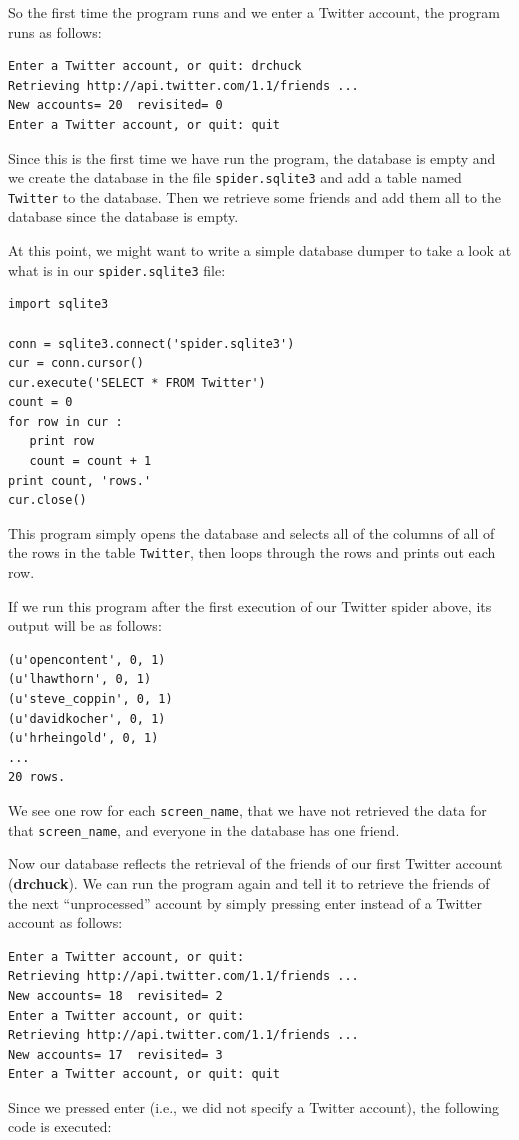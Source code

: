 So the first time the program runs and we enter a Twitter account, the program
runs as follows:

\beforeverb
\begin{verbatim}
Enter a Twitter account, or quit: drchuck
Retrieving http://api.twitter.com/1.1/friends ...
New accounts= 20  revisited= 0
Enter a Twitter account, or quit: quit
\end{verbatim}
\afterverb
%
Since this is the first time we have run the program, the database
is empty and we create the database in the file {\tt spider.sqlite3} and
add a table named {\tt Twitter} to the database.  Then we retrieve
some friends and add them all to the database since the database is
empty.

At this point, we might want to write a simple database dumper
to take a look at what is in our {\tt spider.sqlite3} file:

\beforeverb
\begin{verbatim}
import sqlite3

conn = sqlite3.connect('spider.sqlite3')
cur = conn.cursor()
cur.execute('SELECT * FROM Twitter')
count = 0
for row in cur :
   print row
   count = count + 1
print count, 'rows.'
cur.close()
\end{verbatim}
\afterverb
%
This program simply opens the database and selects all of the 
columns of all of the rows in the table {\tt Twitter}, then 
loops through the rows and prints out each row.

If we run this program after the first execution of our Twitter
spider above, its output will be as follows:

\beforeverb
\begin{verbatim}
(u'opencontent', 0, 1)
(u'lhawthorn', 0, 1)
(u'steve_coppin', 0, 1)
(u'davidkocher', 0, 1)
(u'hrheingold', 0, 1)
...
20 rows.
\end{verbatim}
\afterverb
%
We see one row for each \verb"screen_name", that we 
have not retrieved the data for that \verb"screen_name", and 
everyone in the database has one friend.

Now our database reflects the retrieval of the friends of 
our first Twitter account ({\bf drchuck}).  We can run the program
again and tell it to retrieve the friends of the next 
``unprocessed'' account by simply pressing enter instead of
a Twitter account as follows:

\beforeverb
\begin{verbatim}
Enter a Twitter account, or quit: 
Retrieving http://api.twitter.com/1.1/friends ...
New accounts= 18  revisited= 2
Enter a Twitter account, or quit: 
Retrieving http://api.twitter.com/1.1/friends ...
New accounts= 17  revisited= 3
Enter a Twitter account, or quit: quit
\end{verbatim}
\afterverb
%
Since we pressed enter (i.e., we did not specify a Twitter account),
the following code is executed:

